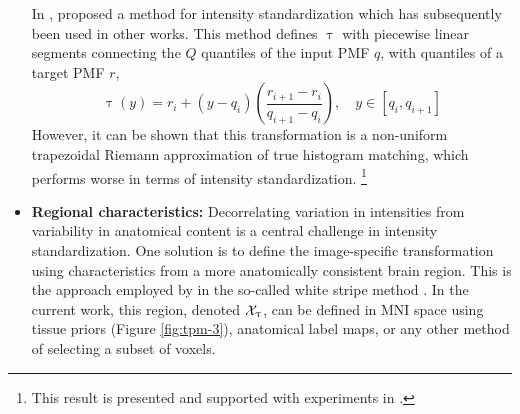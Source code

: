 \begin{itemize}
  In \cite{Nyul1999,Nyul2000}, \citeauthor{Nyul1999} proposed a method for intensity standardization which has subsequently been used in other works.
  This method defines $\uptau$ with piecewise linear segments connecting the $Q$ quantiles of the input PMF $q$, with quantiles of a target PMF $r$,
  \begin{equation}\uptau(y) = r_i + \left(y-q_i\right)\left(\frac{r_{i+1}-r_i}{q_{i+1}-q_i}\right),\quad y\in[q_i,q_{i+1}]\end{equation}
  However, it can be shown that this transformation is a non-uniform trapezoidal Riemann approximation of true histogram matching, which performs worse in terms of intensity standardization.%
  \footnote{This result is presented and supported with experiments in \cite{Knight2017}.}
  \item \textbf{Regional characteristics:}
  Decorrelating variation in intensities from variability in anatomical content is a central challenge in intensity standardization.
  One solution is to define the image-specific transformation using characteristics from a more anatomically consistent brain region.
  This is the approach employed by \citeauthor{Shinohara2014} in the so-called white stripe method \cite{Shinohara2014}.
  In the current work, this region, denoted $\mathcal{X}_{\uptau}$, can be defined in MNI space using tissue priors (Figure \ref{fig:tpm-3}), anatomical label maps, or any other method of selecting a subset of voxels.
\end{itemize}
